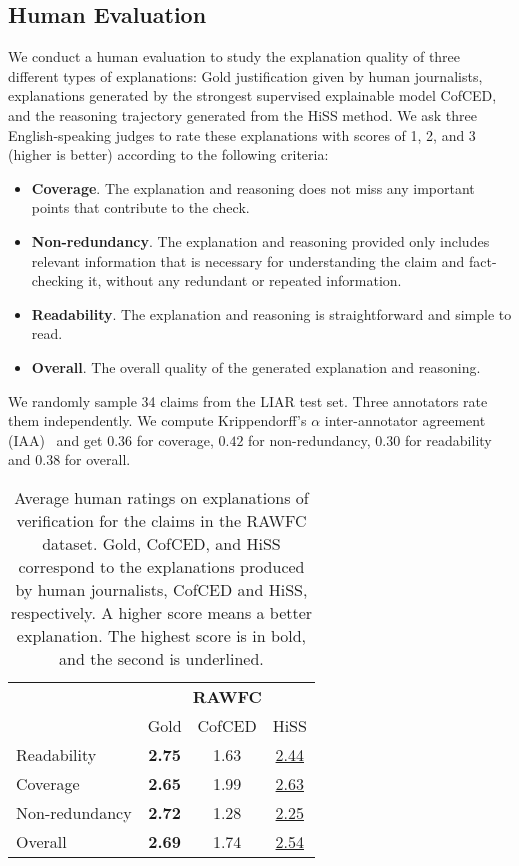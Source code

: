 \documentclass[11pt]{article}
\begin{document}
\subsection{Human Evaluation}
We conduct a human evaluation to study the explanation quality of three different types of explanations: Gold justification given by human journalists, explanations generated by the strongest supervised explainable model CofCED, and the reasoning trajectory generated from the HiSS method. We ask three English-speaking judges to rate these explanations with scores of 1, 2, and 3 (higher is better) according to the following criteria:
\begin{itemize}[leftmargin=*]
    \item\textbf{Coverage}. The explanation and reasoning does not miss any important points that contribute to the check.
    \item\textbf{Non-redundancy}. The explanation and reasoning provided only includes relevant information that is necessary for understanding the claim and fact-checking it, without any redundant or repeated information.
    \item\textbf{Readability}. The explanation and reasoning is straightforward and simple to read.
    \item\textbf{Overall}. The overall quality of the generated explanation and reasoning.
\end{itemize}
We randomly sample 34 claims from the LIAR test set. Three annotators rate them independently. We compute Krippendorff’s $\alpha$ inter-annotator agreement (IAA)~\cite{hayes2007answering} and get $0.36$ for coverage, $0.42$ for non-redundancy, $0.30$ for readability and $0.38$ for overall.

\begin{table}[t!]
\centering
\begin{tabular}{lccc}
\toprule
& \multicolumn{3}{c}{\textbf{RAWFC}}\\ 
\cmidrule(lr){2-4} 
&Gold&CofCED&HiSS\\
 \midrule

Readability&\textbf{2.75}&1.63&\ul{2.44}\\
Coverage&\textbf{2.65}&1.99&\ul{2.63}\\
Non-redundancy&\textbf{2.72}&1.28&\ul{2.25}\\
Overall&\textbf{2.69}&1.74&\ul{2.54}\\

\bottomrule

\end{tabular}
\caption{Average human ratings on explanations of verification for the claims in the RAWFC dataset. Gold, CofCED, and HiSS correspond to the explanations produced by human journalists, CofCED and HiSS, respectively. A higher score means a better explanation. The highest score is in bold, and the second is underlined.}
\label{tbl_human}
\end{table}
\end{document}

